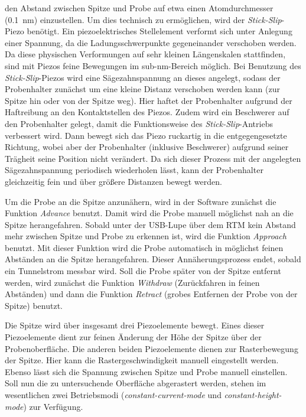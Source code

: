 den Abstand zwischen Spitze und Probe auf etwa einen Atomdurchmesser (\SI{0,1}{\nano \meter}) einzustellen. Um dies technisch zu ermöglichen, wird der
\textit{Stick-Slip}-Piezo benötigt. Ein piezoelektrisches Stellelement verformt sich unter Anlegung einer Spannung, da die Ladungsschwerpunkte
gegeneinander verschoben werden. Da diese physischen Verformungen auf sehr kleinen Längenskalen stattfinden, sind mit Piezos feine Bewegungen im sub-\unit{\nano \meter}-Bereich
möglich. Bei Benutzung des \textit{Stick-Slip}-Piezos wird eine Sägezahnspannung an dieses angelegt, sodass der Probenhalter zunächst um eine kleine Distanz
verschoben werden kann (zur Spitze hin oder von der Spitze weg). Hier haftet der Probenhalter aufgrund der Haftreibung an den Kontaktstellen des Piezos.
Zudem wird ein Beschwerer auf den Probenhalter gelegt, damit die Funktionsweise des \textit{Stick-Slip}-Antriebs verbessert wird.
Dann bewegt sich das Piezo ruckartig in die entgegengesetzte Richtung, wobei aber der Probenhalter (inklusive Beschwerer) aufgrund seiner Trägheit seine Position nicht verändert.
Da sich dieser Prozess mit der angelegten Sägezahnspannung periodisch wiederholen lässt, kann der Probenhalter gleichzeitig fein und über größere Distanzen bewegt werden.\par
Um die Probe an die Spitze anzunähern, wird in der Software zunächst die Funktion \textit{Advance} benutzt. Damit wird die Probe manuell möglichst nah an die Spitze
herangefahren. Sobald unter der USB-Lupe über dem RTM kein Abstand mehr zwischen Spitze und Probe zu erkennen ist, wird die Funktion \textit{Approach} benutzt.
Mit dieser Funktion wird die Probe automatisch in möglichst feinen Abständen an die Spitze herangefahren. Dieser Annäherungsprozess endet, sobald ein Tunnelstrom messbar wird.
Soll die Probe später von der Spitze entfernt werden, wird zunächst die Funktion \textit{Withdraw} (Zurückfahren in feinen Abständen) und dann die Funktion
\textit{Retract} (grobes Entfernen der Probe von der Spitze) benutzt.\par
Die Spitze wird über insgesamt drei Piezoelemente bewegt. Eines dieser Piezoelemente dient zur feinen Änderung der Höhe der Spitze über der Probenoberfläche.
Die anderen beiden Piezoelemente dienen zur Rasterbewegung der Spitze. Hier kann die Rastergeschwindigkeit manuell eingestellt werden.
Ebenso lässt sich die Spannung zwischen Spitze und Probe manuell einstellen. Soll nun die zu untersuchende Oberfläche abgerastert werden, stehen im wesentlichen zwei
Betriebsmodi (\textit{constant-current-mode} und \textit{constant-height-mode}) zur Verfügung.\par
